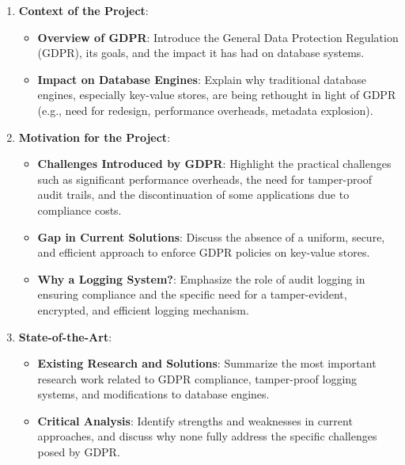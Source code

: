 \begin{enumerate}
        \item \textbf{Context of the Project}:
              \begin{itemize}
                      \item \textbf{Overview of GDPR}:
                            Introduce the General Data Protection Regulation (GDPR), its goals, and the impact it has had on database systems.
                      \item \textbf{Impact on Database Engines}:
                            Explain why traditional database engines, especially key-value stores, are being rethought in light of GDPR (e.g., need for redesign, performance overheads, metadata explosion).
              \end{itemize}
        \item \textbf{Motivation for the Project}:
              \begin{itemize}
                      \item \textbf{Challenges Introduced by GDPR}:
                            Highlight the practical challenges such as significant performance overheads, the need for tamper-proof audit trails, and the discontinuation of some applications due to compliance costs.
                      \item \textbf{Gap in Current Solutions}:
                            Discuss the absence of a uniform, secure, and efficient approach to enforce GDPR policies on key-value stores.
                      \item \textbf{Why a Logging System?}:
                            Emphasize the role of audit logging in ensuring compliance and the specific need for a tamper-evident, encrypted, and efficient logging mechanism.
              \end{itemize}
        \item \textbf{State-of-the-Art}:
              \begin{itemize}
                      \item \textbf{Existing Research and Solutions}:
                            Summarize the most important research work related to GDPR compliance, tamper-proof logging systems, and modifications to database engines.
                      \item \textbf{Critical Analysis}:
                            Identify strengths and weaknesses in current approaches, and discuss why none fully address the specific challenges posed by GDPR.
              \end{itemize}

\end{enumerate}
